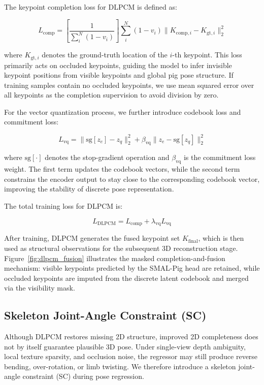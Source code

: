 \documentclass[computers,article,submit,pdftex,moreauthors]{mdpi}
\begin{document}
The keypoint completion loss for DLPCM is defined as:

\begin{equation}
L_{\text{comp}} = \left[\frac{1}{\sum_i^N (1 - v_i)}\right] \sum_i^N (1 - v_i) \|K_{\text{comp},i} - K_{\text{gt},i}\|_2^2
\end{equation}

where $K_{\text{gt},i}$ denotes the ground-truth location of the $i$-th keypoint. This loss primarily acts on occluded keypoints, guiding the model to infer invisible keypoint positions from visible keypoints and global pig pose structure. If training samples contain no occluded keypoints, we use mean squared error over all keypoints as the completion supervision to avoid division by zero.

For the vector quantization process, we further introduce codebook loss and commitment loss:

\begin{equation}
L_{\text{vq}} = \|\text{sg}[z_e] - z_q\|_2^2 + \beta_{\text{vq}} \|z_e - \text{sg}[z_q]\|_2^2
\end{equation}

where $\text{sg}[\cdot]$ denotes the stop-gradient operation and $\beta_{\text{vq}}$ is the commitment loss weight. The first term updates the codebook vectors, while the second term constrains the encoder output to stay close to the corresponding codebook vector, improving the stability of discrete pose representation.

The total training loss for DLPCM is:

\begin{equation}
L_{\text{DLPCM}} = L_{\text{comp}} + \lambda_{\text{vq}} L_{\text{vq}}
\end{equation}

After training, DLPCM generates the fused keypoint set $K_{\text{final}}$, which is then used as structural observations for the subsequent 3D reconstruction stage. Figure~\ref{fig:dlpcm_fusion} illustrates the masked completion-and-fusion mechanism: visible keypoints predicted by the SMAL-Pig head are retained, while occluded keypoints are imputed from the discrete latent codebook and merged via the visibility mask.

\subsection{Skeleton Joint-Angle Constraint (SC)}\label{sec:sc}

Although DLPCM restores missing 2D structure, improved 2D completeness does not by itself guarantee plausible 3D pose. Under single-view depth ambiguity, local texture sparsity, and occlusion noise, the regressor may still produce reverse bending, over-rotation, or limb twisting. We therefore introduce a skeleton joint-angle constraint (SC) during pose regression.
\end{document}
